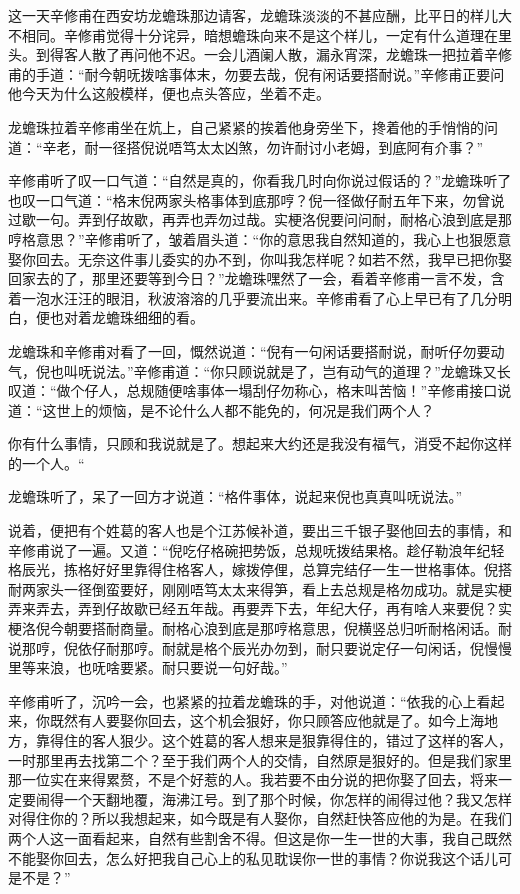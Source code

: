 \documentclass[12pt,UTF8]{ctexbook}
\begin{document}
{{{这一天辛修甫在西安坊龙蟾珠那边请客，龙蟾珠淡淡的不甚应酬，比平日的样儿大不相同。辛修甫觉得十分诧异，暗想蟾珠向来不是这个样儿，一定有什么道理在里头。到得客人散了再问他不迟。一会儿酒阑人散，漏永宵深，龙蟾珠一把拉着辛修甫的手道：“耐今朝呒拨啥事体末，勿要去哉，倪有闲话要搭耐说。”辛修甫正要问他今天为什么这般模样，便也点头答应，坐着不走。

龙蟾珠拉着辛修甫坐在炕上，自己紧紧的挨着他身旁坐下，搀着他的手悄悄的问道：“辛老，耐一径搭倪说唔笃太太凶煞，勿许耐讨小老姆，到底阿有介事？”

辛修甫听了叹一口气道：“自然是真的，你看我几时向你说过假话的？”龙蟾珠听了也叹一口气道：“格末倪两家头格事体到底那哼？倪一径做仔耐五年下来，勿曾说过歇一句。弄到仔故歇，再弄也弄勿过哉。实梗洛倪要问问耐，耐格心浪到底是那哼格意思？”辛修甫听了，皱着眉头道：“你的意思我自然知道的，我心上也狠愿意娶你回去。无奈这件事儿委实的办不到，你叫我怎样呢？如若不然，我早已把你娶回家去的了，那里还要等到今日？”龙蟾珠嘿然了一会，看着辛修甫一言不发，含着一泡水汪汪的眼泪，秋波溶溶的几乎要流出来。辛修甫看了心上早已有了几分明白，便也对着龙蟾珠细细的看。

龙蟾珠和辛修甫对看了一回，慨然说道：“倪有一句闲话要搭耐说，耐听仔勿要动气，倪也叫呒说法。”辛修甫道：“你只顾说就是了，岂有动气的道理？”龙蟾珠又长叹道：“做个仔人，总规随便啥事体一塌刮仔勿称心，格末叫苦恼！”辛修甫接口说道：“这世上的烦恼，是不论什么人都不能免的，何况是我们两个人？

你有什么事情，只顾和我说就是了。想起来大约还是我没有福气，消受不起你这样的一个人。“

龙蟾珠听了，呆了一回方才说道：“格件事体，说起来倪也真真叫呒说法。”

说着，便把有个姓葛的客人也是个江苏候补道，要出三千银子娶他回去的事情，和辛修甫说了一遍。又道：“倪吃仔格碗把势饭，总规呒拨结果格。趁仔勒浪年纪轻格辰光，拣格好好里靠得住格客人，嫁拨停俚，总算完结仔一生一世格事体。倪搭耐两家头一径倒蛮要好，刚刚唔笃太太来得笋，看上去总规是格勿成功。就是实梗弄来弄去，弄到仔故歇已经五年哉。再要弄下去，年纪大仔，再有啥人来要倪？实梗洛倪今朝要搭耐商量。耐格心浪到底是那哼格意思，倪横竖总归听耐格闲话。耐说那哼，倪依仔耐那哼。耐就是格个辰光办勿到，耐只要说定仔一句闲话，倪慢慢里等来浪，也呒啥要紧。耐只要说一句好哉。”

辛修甫听了，沉吟一会，也紧紧的拉着龙蟾珠的手，对他说道：“依我的心上看起来，你既然有人要娶你回去，这个机会狠好，你只顾答应他就是了。如今上海地方，靠得住的客人狠少。这个姓葛的客人想来是狠靠得住的，错过了这样的客人，一时那里再去找第二个？至于我们两个人的交情，自然原是狠好的。但是我们家里那一位实在来得累赘，不是个好惹的人。我若要不由分说的把你娶了回去，将来一定要闹得一个天翻地覆，海沸江号。到了那个时候，你怎样的闹得过他？我又怎样对得住你的？所以我想起来，如今既是有人娶你，自然赶快答应他的为是。在我们两个人这一面看起来，自然有些割舍不得。但这是你一生一世的大事，我自己既然不能娶你回去，怎么好把我自己心上的私见耽误你一世的事情？你说我这个话儿可是不是？”

}}}
\end{document}
